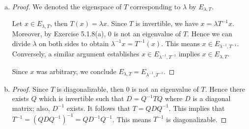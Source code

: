 \begin{Exercise}
\begin{enumerate}[(a)]
\item
\begin{proof}
We denoted the eigenspace of $T$ corresponding to $\lambda$ by $E_{\lambda,T}$.

Let $x\in E_{\lambda, T}$, then $T(x) = \lambda x$. Since $T$ is invertible, we have $x = \lambda T^{-1} x$. Moreover, by Exercise 5.1.8(a), $0$ is not an eigenvalue of $T$. Hence we can divide $\lambda$ on both sides to obtain $\lambda^{-1} x = T^{-1}(x)$. This means $x\in E_{\lambda^{-1},T^{-1}}$. Conversely, a similar argument establishes $x\in E_{\lambda^{-1},T^{-1}}$ implies $x\in E_{\lambda, T}$.

Since $x$ was arbitrary, we conclude $ E_{\lambda, T} = E_{\lambda^{-1},T^{-1}}$.
\end{proof}

\item
\begin{proof}
Since $T$ is diagonalizable, then $0$ is not an eigenvalue of $T$. Hence there exists $Q$ which is invertible such that $D = Q^{-1} T Q$ where $D$ is a diagonal matrix; also, $D^{-1}$ exists. It follows that $T = Q D Q^{-1}$. This implies that $T^{-1} = (Q D Q^{-1})^{-1} = Q D^{-1} Q^{-1}$. This means $T^{-1}$ is diagonalizable.
\end{proof}
\end{enumerate}
\end{Exercise}